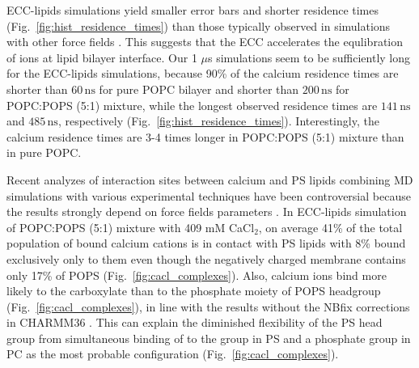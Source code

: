 \documentclass[journal=jpcbfk,manuscript=article]{achemso}
\begin{document}
ECC-lipids simulations yield smaller error bars and shorter residence times (Fig.~\ref{fig:hist_residence_times}) 
than those typically observed in simulations with other force fields \cite{javanainen17,melcr18,NMRlipidsIV}.
This suggests that the ECC accelerates the equlibration of ions at lipid bilayer interface.
Our 1 $\mu$s simulations seem to be sufficiently long for the ECC-lipids simulations, because
90\% of the calcium residence times are shorter than $60\,\mathrm{ns}$ for pure POPC bilayer
and shorter than $200\,\mathrm{ns}$ for POPC:POPS (5:1) mixture, while the
longest observed residence times are $141\,\mathrm{ns}$ and $485\,\mathrm{ns}$, respectively (Fig.~\ref{fig:hist_residence_times}).
Interestingly, the calcium residence times are 3-4 times longer in POPC:POPS (5:1) mixture than in pure POPC.





%



Recent analyzes of interaction sites between calcium and PS lipids combining
MD simulations with various experimental techniques have been 
controversial because the results strongly depend on force fields parameters \cite{melcrova16,valentine18,hallock18}.
In ECC-lipids simulation of POPC:POPS (5:1) mixture with 409 mM CaCl$_2$,
on average 41\% of the total population of bound calcium cations is in contact with PS lipids
with 8\% bound exclusively only to them even though the negatively charged membrane contains only 17\% of POPS (Fig.~\ref{fig:cacl_complexes}).
Also, calcium ions bind more likely 
to the carboxylate than to the phosphate moiety of POPS headgroup (Fig.~\ref{fig:cacl_complexes}),
in line with the results without the NBfix corrections in CHARMM36 \cite{hallock18}.
This can explain the diminished flexibility of the PS head group 
from simultaneous binding of  to the  group in PS and a phosphate group in PC 
as the most probable configuration (Fig.~\ref{fig:cacl_complexes}). 
\end{document}
